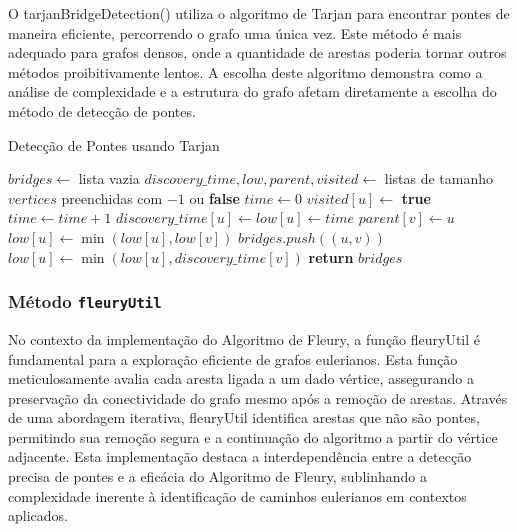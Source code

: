 \documentclass[12pt]{article}
\begin{document}
O tarjanBridgeDetection() utiliza o algoritmo de Tarjan para encontrar pontes de maneira eficiente, percorrendo o grafo uma única vez. Este método é mais adequado para grafos densos, onde a quantidade de arestas poderia tornar outros métodos proibitivamente lentos. A escolha deste algoritmo demonstra como a análise de complexidade e a estrutura do grafo afetam diretamente a escolha do método de detecção de pontes.
\begin{algorithm}[H]
\caption{Detecção de Pontes usando Tarjan}
\begin{algorithmic}[1]
    \State $bridges \gets$ lista vazia 
    \State $discovery\_time, low, parent, visited \gets$ listas de tamanho $vertices$ preenchidas com $-1$ ou \textbf{false}
    \State $time \gets 0$
        \State $visited[u] \gets$ \textbf{true}
        \State $time \gets time + 1$
        \State $discovery\_time[u] \gets low[u] \gets time$
                \State $parent[v] \gets u$
                \State {}
                \State $low[u] \gets \min(low[u], low[v])$
                    \State $bridges.push((u, v))$ 
                \EndIf
                \State $low[u] \gets \min(low[u], discovery\_time[v])$
            \EndIf
        \EndFor
    \EndFunction
            \State {} 
        \EndIf
    \EndFor
    \State \textbf{return} $bridges$
\EndFunction
\end{algorithmic}
\end{algorithm}


\subsubsection{Método \texttt{fleuryUtil}}

No contexto da implementação do Algoritmo de Fleury, a função fleuryUtil é fundamental para a exploração eficiente de grafos eulerianos. Esta função meticulosamente avalia cada aresta ligada a um dado vértice, assegurando a preservação da conectividade do grafo mesmo após a remoção de arestas. Através de uma abordagem iterativa, fleuryUtil identifica arestas que não são pontes, permitindo sua remoção segura e a continuação do algoritmo a partir do vértice adjacente. Esta implementação destaca a interdependência entre a detecção precisa de pontes e a eficácia do Algoritmo de Fleury, sublinhando a complexidade inerente à identificação de caminhos eulerianos em contextos aplicados.
\end{document}
